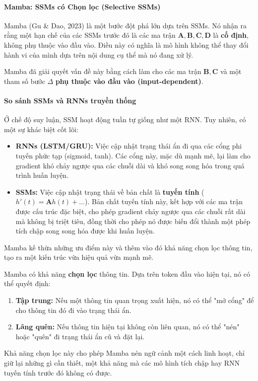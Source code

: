 \paragraph{Mamba: SSMs có Chọn lọc (Selective SSMs)}
Mamba (Gu \& Dao, 2023) \cite{gu2023mamba} là một bước đột phá lớn dựa trên SSMs. Nó nhận ra rằng một hạn chế của các SSMs trước đó là các ma trận $\mathbf{A, B, C, D}$ là \textbf{cố định}, không phụ thuộc vào đầu vào. Điều này có nghĩa là mô hình không thể thay đổi hành vi của mình dựa trên nội dung cụ thể mà nó đang xử lý.

Mamba đã giải quyết vấn đề này bằng cách làm cho các ma trận $\mathbf{B, C}$ và một tham số bước $\Delta$ \textbf{phụ thuộc vào đầu vào (input-dependent)}.
\paragraph{So sánh SSMs và RNNs truyền thống}
Ở chế độ suy luận, SSM hoạt động tuần tự giống như một RNN. Tuy nhiên, có một sự khác biệt cốt lõi:
\begin{itemize}
    \item \textbf{RNNs (LSTM/GRU):} Việc cập nhật trạng thái ẩn đi qua các cổng phi tuyến phức tạp (sigmoid, tanh). Các cổng này, mặc dù mạnh mẽ, lại làm cho gradient khó chảy ngược qua các chuỗi dài và khó song song hóa trong quá trình huấn luyện.
    \item \textbf{SSMs:} Việc cập nhật trạng thái về bản chất là \textbf{tuyến tính} ($h'(t) = \mathbf{A}h(t) + \dots$). Bản chất tuyến tính này, kết hợp với các ma trận được cấu trúc đặc biệt, cho phép gradient chảy ngược qua các chuỗi rất dài mà không bị triệt tiêu, đồng thời cho phép nó được biến đổi thành một phép tích chập song song hóa được khi huấn luyện.
\end{itemize}
Mamba kế thừa những ưu điểm này và thêm vào đó khả năng chọn lọc thông tin, tạo ra một kiến trúc vừa hiệu quả vừa mạnh mẽ.
\begin{tcolorbox}[
    title=Cơ chế Chọn lọc của Mamba,
    colback=green!5!white, colframe=green!60!black, fonttitle=\bfseries
]
Mamba có khả năng \textbf{chọn lọc} thông tin. Dựa trên token đầu vào hiện tại, nó có thể quyết định:
\begin{enumerate}
    \item \textbf{Tập trung:} Nếu một thông tin quan trọng xuất hiện, nó có thể "mở cổng" để cho thông tin đó đi vào trạng thái ẩn.
    \item \textbf{Lãng quên:} Nếu thông tin hiện tại không còn liên quan, nó có thể "nén" hoặc "quên" đi trạng thái ẩn cũ và đặt lại.
\end{enumerate}
Khả năng chọn lọc này cho phép Mamba nén ngữ cảnh một cách linh hoạt, chỉ giữ lại những gì cần thiết, một khả năng mà các mô hình tích chập hay RNN tuyến tính trước đó không có được.
\end{tcolorbox}

